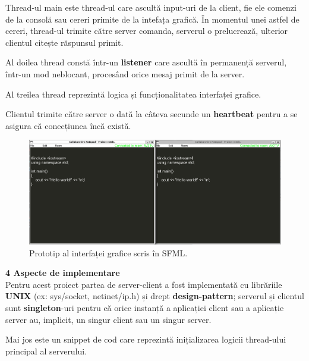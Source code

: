 \documentclass[runningheads]{llncs}
\begin{document}
Thread-ul main este thread-ul care ascultă input-uri de la client, fie ele comenzi de la consolă sau cereri primite de la intefața grafică.
În momentul unei astfel de cereri, thread-ul trimite către server comanda, serverul o prelucrează, ulterior clientul citește răspunsul primit.

Al doilea thread constă într-un {\bf listener} care ascultă în permanență serverul, într-un mod neblocant, procesând orice mesaj primit de la server.

Al treilea thread reprezintă logica și funcționalitatea interfaței grafice.

Clientul trimite către server o dată la câteva secunde un {\bf heartbeat} pentru a se asigura că conecțiunea încă există.

\begin{figure}[htbp!]
    \hspace{-53px} 
    \includegraphics[scale=0.38]{camera4.png}
    \caption{Prototip al interfaței grafice scris în SFML.}
    \label{fig:yourlabel}
\end{figure}

\newpage
{\Large \bf 4 Aspecte de implementare} 
\\

Pentru acest proiect partea de server-client a fost implementată cu librăriile {\bf UNIX} (ex: sys/socket, netinet/ip.h) și drept {\bf design-pattern};
serverul și clientul sunt {\bf singleton}-uri pentru că orice instanță a aplicației client sau a aplicație server au, implicit, un singur client sau un singur server.

Mai jos este un snippet de cod care reprezintă inițializarea logicii thread-ului principal al serverului.
\\
\end{document}
